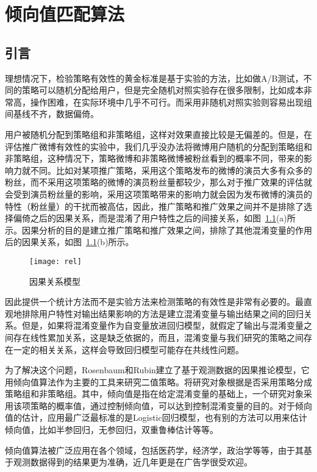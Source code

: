 \chapter{倾向值匹配算法}

\section{引言}

理想情况下，检验策略有效性的黄金标准是基于实验的方法，比如做A/B测试，不同的策略可以随机分配给用户，但是完全随机对照实验存在很多限制，比如成本非常高，操作困难，在实际环境中几乎不可行。而采用非随机对照实验则容易出现组间基线不齐，数据偏倚。

用户被随机分配到策略组和非策略组，这样对效果直接比较是无偏差的。但是，在评估推广微博有效性的实验中，我们几乎没办法将微博用户随机的分配到策略组和非策略组，这种情况下，策略微博和非策略微博被粉丝看到的概率不同，带来的影响力就不同。比如对某项推广策略，采用这个策略发布的微博的演员大多有众多的粉丝，而不采用这项策略的微博的演员粉丝量都较少，那么对于推广效果的评估就会受到演员粉丝量的影响，采用这项策略带来的影响力就会因为发布微博的演员的特性（粉丝量）的干扰而被高估，因此，推广策略和推广效果之间并不是排除了选择偏倚之后的因果关系，而是混淆了用户特性之后的间接关系，如图~\ref{rel}(a)所示。因果分析的目的是建立推广策略和推广效果之间，排除了其他混淆变量的作用后的因果关系，如图~\ref{rel}(b)所示。

\begin{figure}[!htbp]
\centering
\texttt{[image: rel]}
\caption{因果关系模型}
\label{rel}
\end{figure}

因此提供一个统计方法而不是实验方法来检测策略的有效性是非常有必要的。最直观地排除用户特性对输出结果影响的方法是建立混淆变量与输出结果之间的回归关系。但是，如果将混淆变量作为自变量放进回归模型，就假定了输出与混淆变量之间存在线性累加关系，这是缺乏依据的，而且，混淆变量与我们研究的策略之间存在一定的相关关系，这样会导致回归模型可能存在共线性问题。

为了解决这个问题，Rosenbaum和Rubin建立了基于观测数据的因果推论模型\cite{rosenbaum1983central}，它用倾向值算法作为主要的工具来研究二值策略。将研究对象根据是否采用策略分成策略组和非策略组。其中，倾向值是指在给定混淆变量的基础上，一个研究对象采用该项策略的概率值，通过控制倾向值，可以达到控制混淆变量的目的。对于倾向值的估计，应用最广泛最标准的是Logistic回归模型，也有别的方法可以用来估计倾向值，比如半参回归，无参回归，双重鲁棒估计等等。

倾向值算法被广泛应用在各个领域，包括医药学，经济学，政治学等等，由于其基于观测数据得到的结果更为准确，近几年更是在广告学很受欢迎。

